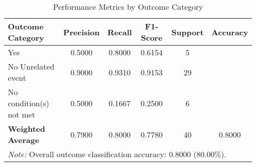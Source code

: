 \begin{table}[H]
\centering
\caption{Performance Metrics by Outcome Category}
\label{tab:classification_metrics}
\begin{tabular}{lccccc}
\toprule
\textbf{Outcome Category} & \textbf{Precision} & \textbf{Recall} & \textbf{F1-Score} & \textbf{Support} & \textbf{Accuracy} \\
\midrule
Yes & 0.5000 & 0.8000 & 0.6154 & 5 & \multirow{1}{*}{} \\
No \- Unrelated event & 0.9000 & 0.9310 & 0.9153 & 29 & \multirow{1}{*}{} \\
No \- condition(s) not met & 0.5000 & 0.1667 & 0.2500 & 6 & \multirow{1}{*}{} \\
\midrule
\textbf{Weighted Average} & 0.7900 & 0.8000 & 0.7780 & 40 & 0.8000 \\
\bottomrule
\multicolumn{6}{p{14cm}}{\textit{Note:} Overall outcome classification accuracy: 0.8000 (80.00\%).} \\
\end{tabular}
\end{table}
